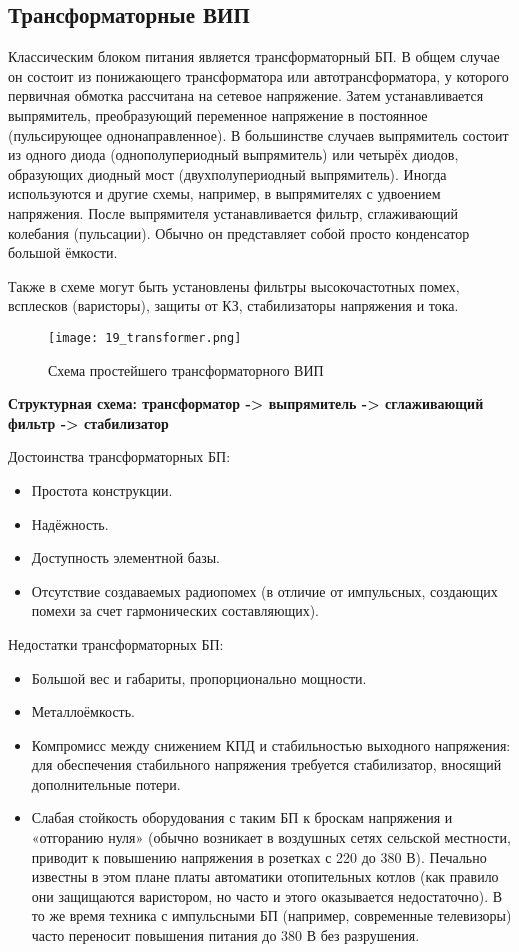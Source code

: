 \subsection*{Трансформаторные ВИП}

Классическим блоком питания является трансформаторный БП. В общем случае он состоит из понижающего трансформатора или автотрансформатора, у которого первичная обмотка рассчитана на сетевое напряжение. Затем устанавливается выпрямитель, преобразующий переменное напряжение в постоянное (пульсирующее однонаправленное). В большинстве случаев выпрямитель состоит из одного диода (однополупериодный выпрямитель) или четырёх диодов, образующих диодный мост (двухполупериодный выпрямитель). Иногда используются и другие схемы, например, в выпрямителях с удвоением напряжения. После выпрямителя устанавливается фильтр, сглаживающий колебания (пульсации). Обычно он представляет собой просто конденсатор большой ёмкости.

Также в схеме могут быть установлены фильтры высокочастотных помех, всплесков (варисторы), защиты от КЗ, стабилизаторы напряжения и тока.

\begin{figure}[H]
\centering
\texttt{[image: 19\_transformer.png]}
\caption{Схема простейшего трансформаторного ВИП}
\label{fig:19_transformer}
\end{figure}

\textbf{Структурная схема: трансформатор -> выпрямитель -> сглаживающий фильтр -> стабилизатор}

Достоинства трансформаторных БП:

\begin{itemize}
\item Простота конструкции.
\item Надёжность.
\item Доступность элементной базы.
\item Отсутствие создаваемых радиопомех (в отличие от импульсных, создающих помехи за счет гармонических составляющих).
\end{itemize}

Недостатки трансформаторных БП:

\begin{itemize}
\item Большой вес и габариты, пропорционально мощности.
\item Металлоёмкость.
\item Компромисс между снижением КПД и стабильностью выходного напряжения: для обеспечения стабильного напряжения требуется стабилизатор, вносящий дополнительные потери.
\item Слабая стойкость оборудования с таким БП к броскам напряжения и «отгоранию нуля» (обычно возникает в воздушных сетях сельской местности, приводит к повышению напряжения в розетках с 220 до 380 В). Печально известны в этом плане платы автоматики отопительных котлов (как правило они защищаются варистором, но часто и этого оказывается недостаточно). В то же время техника с импульсными БП (например, современные телевизоры) часто переносит повышения питания до 380 В без разрушения.
\end{itemize}

